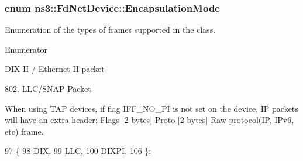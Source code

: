 \subsubsection[{\texorpdfstring{Encapsulation\+Mode}{EncapsulationMode}}]{\setlength{\rightskip}{0pt plus 5cm}enum {\bf ns3\+::\+Fd\+Net\+Device\+::\+Encapsulation\+Mode}}\hypertarget{classns3_1_1FdNetDevice_abdacbf10c181f50998a98e7688016618}{}\label{classns3_1_1FdNetDevice_abdacbf10c181f50998a98e7688016618}
Enumeration of the types of frames supported in the class. \begin{Desc}
\item[Enumerator]\par
\begin{description}
\item[{\em 
D\+IX\hypertarget{classns3_1_1FdNetDevice_abdacbf10c181f50998a98e7688016618a47e79129b21891ac4452ab35e05bd17d}{}\label{classns3_1_1FdNetDevice_abdacbf10c181f50998a98e7688016618a47e79129b21891ac4452ab35e05bd17d}
}]D\+IX II / Ethernet II packet \item[{\em 
L\+LC\hypertarget{classns3_1_1FdNetDevice_abdacbf10c181f50998a98e7688016618ac6f7f5fa39999c05c1b1c2c5e5dd8889}{}\label{classns3_1_1FdNetDevice_abdacbf10c181f50998a98e7688016618ac6f7f5fa39999c05c1b1c2c5e5dd8889}
}]802. L\+L\+C/\+S\+N\+AP \hyperlink{classns3_1_1Packet}{Packet} \item[{\em 
D\+I\+X\+PI\hypertarget{classns3_1_1FdNetDevice_abdacbf10c181f50998a98e7688016618abbad9c0d0fe0604652f21e33cf4d8798}{}\label{classns3_1_1FdNetDevice_abdacbf10c181f50998a98e7688016618abbad9c0d0fe0604652f21e33cf4d8798}
}]When using T\+AP devices, if flag I\+F\+F\+\_\+\+N\+O\+\_\+\+PI is not set on the device, IP packets will have an extra header\+: Flags \mbox{[}2 bytes\mbox{]} Proto \mbox{[}2 bytes\mbox{]} Raw protocol(\+I\+P, I\+Pv6, etc) frame. \end{description}
\end{Desc}

\begin{DoxyCode}
97   \{
98     \hyperlink{classns3_1_1FdNetDevice_abdacbf10c181f50998a98e7688016618a47e79129b21891ac4452ab35e05bd17d}{DIX},         
99     \hyperlink{classns3_1_1FdNetDevice_abdacbf10c181f50998a98e7688016618ac6f7f5fa39999c05c1b1c2c5e5dd8889}{LLC},         
100     \hyperlink{classns3_1_1FdNetDevice_abdacbf10c181f50998a98e7688016618abbad9c0d0fe0604652f21e33cf4d8798}{DIXPI},       
106   \};
\end{DoxyCode}


